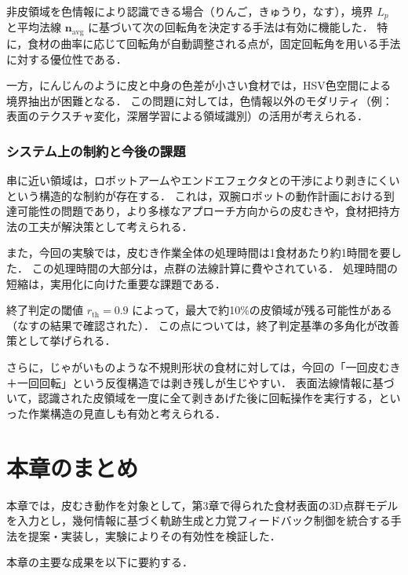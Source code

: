 非皮領域を色情報により認識できる場合（りんご，きゅうり，なす），境界 $L_p$ と平均法線 $\mathbf{n}_{\mathrm{avg}}$ に基づいて次の回転角を決定する手法は有効に機能した．
特に，食材の曲率に応じて回転角が自動調整される点が，固定回転角を用いる手法に対する優位性である．

一方，にんじんのように皮と中身の色差が小さい食材では，HSV色空間による境界抽出が困難となる．
この問題に対しては，色情報以外のモダリティ（例：表面のテクスチャ変化，深層学習による領域識別）の活用が考えられる．

\subsubsection{システム上の制約と今後の課題}

串に近い領域は，ロボットアームやエンドエフェクタとの干渉により剥きにくいという構造的な制約が存在する．
これは，双腕ロボットの動作計画における到達可能性の問題であり，より多様なアプローチ方向からの皮むきや，食材把持方法の工夫が解決策として考えられる．

また，今回の実験では，皮むき作業全体の処理時間は1食材あたり約1時間を要した．
この処理時間の大部分は，点群の法線計算に費やされている．
処理時間の短縮は，実用化に向けた重要な課題である．

終了判定の閾値 $r_{\mathrm{th}} = 0.9$ によって，最大で約10\%の皮領域が残る可能性がある（なすの結果で確認された）．
この点については，終了判定基準の多角化が改善策として挙げられる．

さらに，じゃがいものような不規則形状の食材に対しては，今回の「一回皮むき＋一回回転」という反復構造では剥き残しが生じやすい．
表面法線情報に基づいて，認識された皮領域を一度に全て剥きあげた後に回転操作を実行する，といった作業構造の見直しも有効と考えられる．

\section{本章のまとめ}
\label{sec:peeling_phase_summary}

本章では，皮むき動作を対象として，第3章で得られた食材表面の3D点群モデルを入力とし，幾何情報に基づく軌跡生成と力覚フィードバック制御を統合する手法を提案・実装し，実験によりその有効性を検証した．

本章の主要な成果を以下に要約する．

